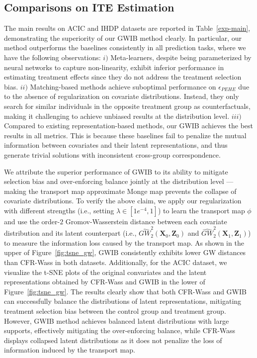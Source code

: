 \documentclass{article}
\begin{document}
\subsection{Comparisons on ITE Estimation}
\label{sec:exp-ite}
The main results on ACIC and IHDP datasets are reported in Table~\ref{exp-main}, demonstrating the superiority of our GWIB method clearly.
In particular, our method outperforms the baselines consistently in all prediction tasks, where we have the following observations:
$i)$ Meta-learners, despite being parameterized by neural networks to capture non-linearity, exhibit inferior performance in estimating treatment effects since they do not address the treatment selection bias.
$ii)$ Matching-based methods achieve suboptimal performance on $\epsilon_{PEHE}$ due to the absence of regularization on covariate distributions. 
Instead, they only search for similar individuals in the opposite treatment group as counterfactuals, making it challenging to achieve unbiased results at the distribution level.
$iii)$ Compared to existing representation-based methods, our GWIB achieves the best results in all metrics. 
This is because these baselines fail to penalize the mutual information between covariates and their latent representations, and thus generate trivial solutions with inconsistent cross-group correspondence.

We attribute the superior performance of GWIB to its ability to mitigate selection bias and over-enforcing balance jointly at the distribution level --- making the transport map approximate Monge map prevents the collapse of covariate distributions. 
To verify the above claim, we apply our regularization with different strengths (i.e., setting $\lambda\in [1e^{-4}, 1]$) to learn the transport map $\phi$ and use the order-$2$ Gromov-Wasserstein distance between each covariate distribution and its latent counterpart (i.e., $\widehat{GW}_2^2(\bm{X}_0, \bm{Z}_0)$ and $\widehat{GW}_2^2(\bm{X}_1, \bm{Z}_1)$) to measure the information loss caused by the transport map.
As shown in the upper of Figure~\ref{fig:tsne_gw}, GWIB consistently exhibits lower GW distances than CFR-Wass in both datasets. 
Additionally, for the ACIC dataset, we visualize the t-SNE plots of the original convariates and the latent representations obtained by CFR-Wass and GWIB in the lower of Figure~\ref{fig:tsne_gw}.
The results clearly show that both CFR-Wass and GWIB can successfully balance the distributions of latent representations, mitigating treatment selection bias between the control group and treatment group. 
However, GWIB method achieves balanced latent distributions with large supports, effectively mitigating the over-enforcing balance, while CFR-Wass displays collapsed latent distributions as it does not penalize the loss of information induced by the transport map.
\end{document}
